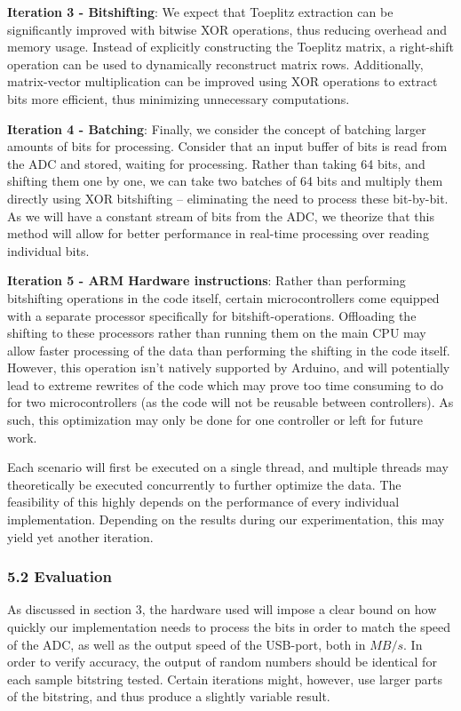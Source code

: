 \textbf{Iteration 3 - Bitshifting}: We expect that Toeplitz extraction can be significantly improved with bitwise XOR operations, thus reducing overhead and memory usage. Instead of explicitly constructing the Toeplitz matrix, a right-shift operation can be used to dynamically reconstruct matrix rows. Additionally, matrix-vector multiplication can be improved using XOR operations to extract bits more efficient, thus minimizing unnecessary computations.

\textbf{Iteration 4 - Batching}: Finally, we consider the concept of batching larger amounts of bits for processing. Consider that an input buffer of bits is read from the ADC and stored, waiting for processing. Rather than taking 64 bits, and shifting them one by one, we can take two batches of 64 bits and multiply them directly using XOR bitshifting -- eliminating the need to process these bit-by-bit. As we will have a constant stream of bits from the ADC, we theorize that this method will allow for better performance in real-time processing over reading individual bits.

\textbf{Iteration 5 - ARM Hardware instructions}: Rather than performing bitshifting operations in the code itself, certain microcontrollers come equipped with a separate processor specifically for bitshift-operations. Offloading the shifting to these processors rather than running them on the main CPU may allow faster processing of the data than performing the shifting in the code itself. However, this operation isn't natively supported by Arduino, and will potentially lead to extreme rewrites of the code which may prove too time consuming to do for two microcontrollers (as the code will not be reusable between controllers). As such, this optimization may only be done for one controller or left for future work.

Each scenario will first be executed on a single thread, and multiple threads may theoretically be executed concurrently to further optimize the data. The feasibility of this highly depends on the performance of every individual implementation. Depending on the results during our experimentation, this may yield yet another iteration.

\subsubsection{5.2 Evaluation}\label{evaluation}

As discussed in section 3, the hardware used will impose a clear bound on how quickly our implementation needs to process the bits in order to match the speed of the ADC, as well as the output speed of the USB-port, both in \(MB/s\). In order to verify accuracy, the output of random numbers should be identical for each sample bitstring tested. Certain iterations might, however, use larger parts of the bitstring, and thus produce a slightly variable result.

